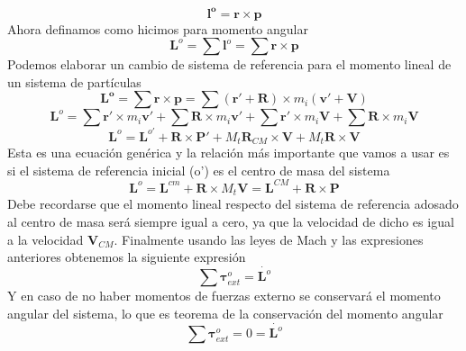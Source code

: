 \documentclass[a4paper]{article}
\numberwithin{equation}{section}
\begin{document}
	\begin{equation}
		\boldsymbol{l^{o}} = \boldsymbol{r} \times \boldsymbol{p}
	\end{equation}
	Ahora definamos como hicimos para momento angular
	\begin{equation}
		\boldsymbol{L}^{o} = \sum \boldsymbol{l}^{o} = \sum \boldsymbol{r} \times \boldsymbol{p}
	\end{equation}
	Podemos elaborar un cambio de sistema de referencia para el momento lineal de un sistema de partículas
	\begin{equation*}
		\boldsymbol{L^{o}} = \sum \boldsymbol{r} \times \boldsymbol{p} = \sum (\boldsymbol{r}' + \boldsymbol{R}) \times m_i (\boldsymbol{v}' + \boldsymbol{V})
	\end{equation*}
	\begin{equation*}
		\boldsymbol{L}^{o} = \sum \boldsymbol{r}' \times m_i \boldsymbol{v}' + \sum \boldsymbol{R} \times m_i \boldsymbol{v}' + \sum \boldsymbol{r}' \times m_i \boldsymbol{V} + \sum \boldsymbol{R} \times m_i \boldsymbol{V}
	\end{equation*}
	\begin{equation}
		\boldsymbol{L}^{o} = \boldsymbol{L}^{o'} + \boldsymbol{R} \times \boldsymbol{P}' + M_t \boldsymbol{R}_{CM} \times \boldsymbol{V} + M_t \boldsymbol{R} \times \boldsymbol{V} \label{eq:l_general}
	\end{equation}
	Esta es una ecuación genérica y la relación más importante que vamos a usar es si el sistema de referencia inicial (o') es el centro de masa del sistema
	\begin{equation}
		\boldsymbol{L}^{o} = \boldsymbol{L}^{cm} + \boldsymbol{R} \times M_t \boldsymbol{V} = \boldsymbol{L}^{CM} + \boldsymbol{R} \times \boldsymbol{P}
	\end{equation}
	Debe recordarse que el momento lineal respecto del sistema de referencia adosado al centro de masa será siempre igual a cero, ya que la velocidad de dicho es igual a la velocidad $\boldsymbol{V}_{CM}$.
	Finalmente usando las leyes de Mach y las expresiones anteriores obtenemos la siguiente expresión
	\begin{equation}
		\sum \boldsymbol{\tau}^{o}_{ext} = \dot{\boldsymbol{L}^{o}} \label{eq:rot_newton_sistemas}
	\end{equation}
	Y en caso de no haber momentos de fuerzas externo se conservará el momento angular del sistema, lo que es teorema de la conservación del momento angular
	\begin{equation}
		\sum \boldsymbol{\tau}^{o}_{ext} = 0 = \dot{\boldsymbol{L}^{o}} \label{eq:teo_l}
	\end{equation}
\end{document}
